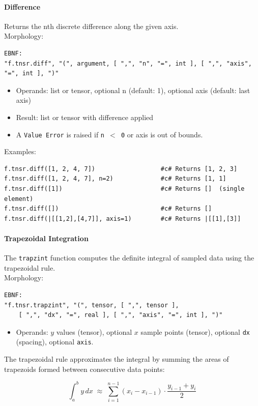\paragraph{Difference}
Returns the nth discrete difference along the given axis.\\
Morphology:
\begin{verbatim}
EBNF:
"f.tnsr.diff", "(", argument, [ ",", "n", "=", int ], [ ",", "axis", "=", int ], ")"
\end{verbatim}
\begin{itemize}
\item Operands: list or tensor, optional n (default: 1), optional axis (default: last axis)
\item Result: list or tensor with difference applied
\item A \texttt{Value Error} is raised if \texttt{n $<$ 0} or axis is out of bounds.
\end{itemize}
Examples:
\begin{verbatim}
f.tnsr.diff([1, 2, 4, 7])                  #c# Returns [1, 2, 3]
f.tnsr.diff([1, 2, 4, 7], n=2)             #c# Returns [1, 1]
f.tnsr.diff([1])                           #c# Returns []  (single element)
f.tnsr.diff([])                            #c# Returns []
f.tnsr.diff(|[[1,2],[4,7]], axis=1)        #c# Returns |[[1],[3]]
\end{verbatim}

\paragraph{Trapezoidal Integration}
The \texttt{trapzint} function computes the definite integral of sampled data using the trapezoidal rule.\\
Morphology:
\begin{verbatim}
EBNF:
"f.tnsr.trapzint", "(", tensor, [ ",", tensor ],
    [ ",", "dx", "=", real ], [ ",", "axis", "=", int ], ")"
\end{verbatim}
\begin{itemize}
\item Operands: $y$ values (tensor), optional $x$ sample points (tensor), optional \texttt{dx} (spacing), optional \texttt{axis}.
\end{itemize}

The trapezoidal rule approximates the integral by summing the areas of trapezoids formed between consecutive data points:

\begin{equation}
\int_a^b y \, dx \;\approx\; \sum_{i=1}^{n-1} (x_i - x_{i-1}) \cdot \frac{y_{i-1} + y_i}{2}
\label{eq:trapz}
\end{equation}

